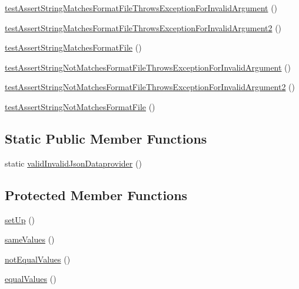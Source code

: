 \begin{DoxyCompactItemize}
\item 
\mbox{\hyperlink{class_framework___assert_test_ae1fa121636871ccefba75a2a14fd04af}{test\+Assert\+String\+Matches\+Format\+File\+Throws\+Exception\+For\+Invalid\+Argument}} ()
\item 
\mbox{\hyperlink{class_framework___assert_test_a324c65769bcb73e44078a57c275a82dc}{test\+Assert\+String\+Matches\+Format\+File\+Throws\+Exception\+For\+Invalid\+Argument2}} ()
\item 
\mbox{\hyperlink{class_framework___assert_test_a173a96eab8a73d1e09abb15bc38301e9}{test\+Assert\+String\+Matches\+Format\+File}} ()
\item 
\mbox{\hyperlink{class_framework___assert_test_a0b576f034e503c907d7173a869b9ea09}{test\+Assert\+String\+Not\+Matches\+Format\+File\+Throws\+Exception\+For\+Invalid\+Argument}} ()
\item 
\mbox{\hyperlink{class_framework___assert_test_a72f21227c437c911c2577c3c8e3ff6ef}{test\+Assert\+String\+Not\+Matches\+Format\+File\+Throws\+Exception\+For\+Invalid\+Argument2}} ()
\item 
\mbox{\hyperlink{class_framework___assert_test_a463625497b74642e285cdd373074d4de}{test\+Assert\+String\+Not\+Matches\+Format\+File}} ()
\end{DoxyCompactItemize}
\subsection*{Static Public Member Functions}
\begin{DoxyCompactItemize}
\item 
static \mbox{\hyperlink{class_framework___assert_test_a041825ac51dcd0510be11c37121522c2}{valid\+Invalid\+Json\+Dataprovider}} ()
\end{DoxyCompactItemize}
\subsection*{Protected Member Functions}
\begin{DoxyCompactItemize}
\item 
\mbox{\hyperlink{class_framework___assert_test_a0bc688732d2b3b162ffebaf7812e78da}{set\+Up}} ()
\item 
\mbox{\hyperlink{class_framework___assert_test_a6304ccf6c6bed5f5fc12c89ccc74205b}{same\+Values}} ()
\item 
\mbox{\hyperlink{class_framework___assert_test_ac097995f79ea84ffdae4a60b197bfbf5}{not\+Equal\+Values}} ()
\item 
\mbox{\hyperlink{class_framework___assert_test_aa7448c3af9d31376ac32a2b3941c6488}{equal\+Values}} ()
\end{DoxyCompactItemize}
